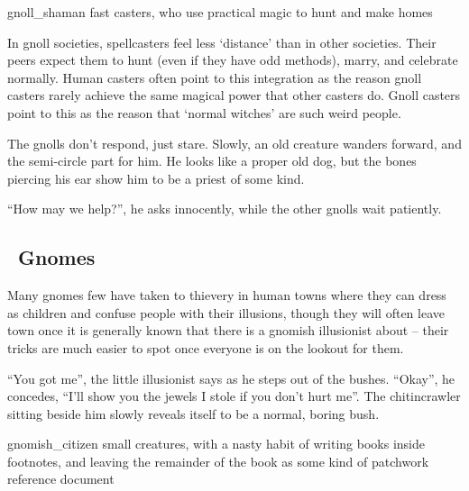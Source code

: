 \begin{multicols}{2}
\begin{boxtext}
\end{boxtext}

  {gnoll_shaman}%
  {fast casters, who use practical magic to hunt and make homes}%

In gnoll societies, spellcasters feel less `distance' than in other societies.
Their peers expect them to hunt (even if they have odd methods), marry, and celebrate normally.
Human casters often point to this integration as the reason gnoll casters rarely achieve the same magical power that other casters do.
Gnoll casters point to this as the reason that `normal witches' are such weird people.


\begin{boxtext}

  The gnolls don't respond, just stare.  
  Slowly, an old creature wanders forward, and the semi-circle part for him.
  He looks like a proper old dog, but the bones piercing his ear show him to be a priest of some kind.

  ``How may we help?'', he asks innocently, while the other gnolls wait patiently.

\end{boxtext}

\subsection[Gnomes]{\Gn\ Gnomes}
\label{best_gnomes}

Many gnomes few have taken to thievery in human towns where they can dress as children and confuse people with their illusions, though they will often leave town once it is generally known that there is a gnomish illusionist about -- their tricks are much easier to spot once everyone is on the lookout for them.

\begin{boxtext}

  ``You got me'', the little illusionist says as he steps out of the bushes.
  ``Okay'', he concedes, ``I'll show you the jewels I stole if you don't hurt me''.
  The chitincrawler sitting beside him slowly reveals itself to be a normal, boring bush.

\end{boxtext}

  {gnomish_citizen}%
  {small creatures, with a nasty habit of writing books inside footnotes, and leaving the remainder of the book as some kind of patchwork reference document}%


\end{multicols}
